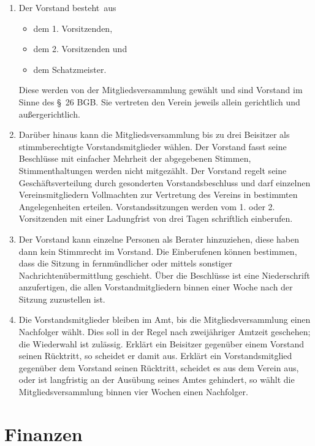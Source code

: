 \documentclass[a4paper, 10pt, headings=normal]{scrartcl}
\begin{document}
\begin{multicols}{2}
\begin{enumerate}[label={(\arabic*)}]
	\item
		Der Vorstand besteht aus
		\begin{itemize}[label={–}]
			\item
				dem 1. Vorsitzenden,
			\item
				dem 2. Vorsitzenden und
			\item
				dem Schatzmeister.
		\end{itemize}
		Diese werden von der Mitgliedsversammlung gewählt und sind Vorstand im Sinne des §~26 BGB.
		Sie vertreten den Verein jeweils allein gerichtlich und außergerichtlich.
	\item
		Darüber hinaus kann die Mitgliedsversammlung bis zu drei Beisitzer als stimmberechtigte Vorstandsmitglieder wählen.
		Der Vorstand fasst seine Beschlüsse mit einfacher Mehrheit der abgegebenen Stimmen, Stimmenthaltungen werden nicht mitgezählt.
		Der Vorstand regelt seine Geschäftsverteilung durch gesonderten Vorstandsbeschluss und darf einzelnen Vereinsmitgliedern Vollmachten zur Vertretung des Vereins in bestimmten Angelegenheiten erteilen.
		Vorstandssitzungen werden vom 1. oder 2. Vorsitzenden mit einer Ladungfrist von drei Tagen schriftlich einberufen.
	\item
		Der Vorstand kann einzelne Personen als Berater hinzuziehen, diese haben dann kein Stimmrecht im Vorstand.
		Die Einberufenen können bestimmen, dass die Sitzung in fernmündlicher oder mittels sonstiger Nachrichtenübermittlung geschieht.
		Über die Beschlüsse ist eine Niederschrift anzufertigen, die allen Vorstandmitgliedern binnen einer Woche nach der Sitzung zuzustellen ist.
	\item
		Die Vorstandsmitglieder bleiben im Amt, bis die Mitgliedsversammlung einen Nachfolger wählt.
		Dies soll in der Regel nach zweijähriger Amtzeit geschehen; die Wiederwahl ist zulässig.
		Erklärt ein Beisitzer gegenüber einem Vorstand seinen Rücktritt, so scheidet er damit aus.
		Erklärt ein Vorstandsmitglied gegenüber dem Vorstand seinen Rücktritt, scheidet es aus dem Verein aus, oder ist langfristig an der Ausübung seines Amtes gehindert, so wählt die Mitgliedsversammlung binnen vier Wochen einen Nachfolger.
\end{enumerate}

\section{Finanzen}
\label{par:finanzen}


\end{multicols}
\end{document}

